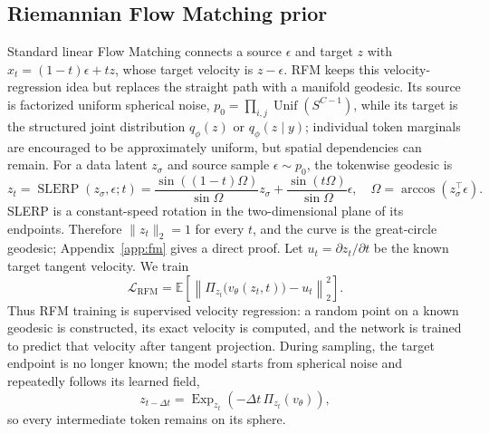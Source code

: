 \documentclass{article}
\begin{document}
\subsection{Riemannian Flow Matching prior}
Standard linear Flow Matching connects a source $\epsilon$ and target $z$ with $x_t=(1-t)\epsilon+tz$, whose target velocity is $z-\epsilon$. RFM keeps this velocity-regression idea but replaces the straight path with a manifold geodesic. Its source is factorized uniform spherical noise, $p_0=\prod_{i,j}\operatorname{Unif}(S^{C-1})$, while its target is the structured joint distribution $q_\phi(z)$ or $q_\phi(z\mid y)$; individual token marginals are encouraged to be approximately uniform, but spatial dependencies can remain. For a data latent $z_\sigma$ and source sample $\epsilon\sim p_0$, the tokenwise geodesic is
\begin{equation}
 z_t=\operatorname{SLERP}(z_\sigma,\epsilon;t)
 =\frac{\sin((1-t)\Omega)}{\sin\Omega}z_\sigma
 +\frac{\sin(t\Omega)}{\sin\Omega}\epsilon,
\quad \Omega=\arccos(z_\sigma^\top\epsilon).
\label{eq:slerp}
\end{equation}
SLERP is a constant-speed rotation in the two-dimensional plane of its endpoints. Therefore $\|z_t\|_2=1$ for every $t$, and the curve is the great-circle geodesic; Appendix~\ref{app:fm} gives a direct proof. Let $u_t=\partial z_t/\partial t$ be the known target tangent velocity. We train
\begin{equation}
 \mathcal L_{\mathrm{RFM}}
 =\mathbb E\!\left[\left\|\Pi_{z_t}\big(v_\theta(z_t,t)\big)-u_t\right\|_2^2\right].
\label{eq:rfm}
\end{equation}
Thus RFM training is supervised velocity regression: a random point on a known geodesic is constructed, its exact velocity is computed, and the network is trained to predict that velocity after tangent projection. During sampling, the target endpoint is no longer known; the model starts from spherical noise and repeatedly follows its learned field,
\begin{equation}
 z_{t-\Delta t}=\operatorname{Exp}_{z_t}\!\left(-\Delta t\,\Pi_{z_t}(v_\theta)\right),
\label{eq:sample}
\end{equation}
so every intermediate token remains on its sphere.
\end{document}
